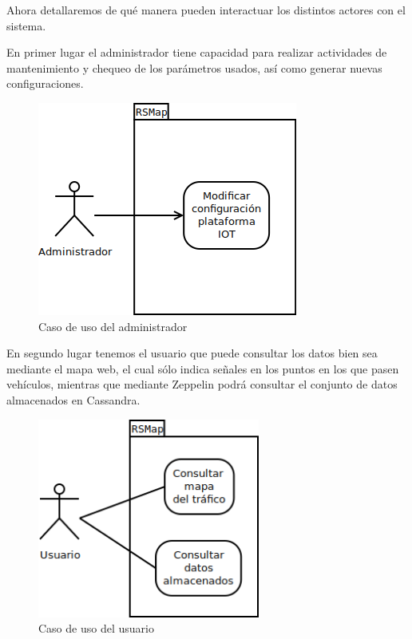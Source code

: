 Ahora detallaremos de qué manera pueden interactuar los distintos actores con el sistema.

En primer lugar el administrador tiene capacidad para realizar actividades de mantenimiento y chequeo de los parámetros usados, así como generar nuevas configuraciones.
\begin{figure}[!ht]
  \begin{center}
    \includegraphics[scale=0.65]{../images/diag_plan/cu_admin.png}
    \caption{Caso de uso del administrador}
    \label{fig:cu_admin}
  \end{center}
\end{figure}

\newpage

En segundo lugar tenemos el usuario que puede consultar los datos bien sea mediante el mapa web, el cual sólo indica señales en los puntos en los que pasen vehículos, mientras que mediante Zeppelin podrá consultar el conjunto de datos almacenados en Cassandra.

\begin{figure}[!ht]
  \begin{center}
  \includegraphics[width=0.65\textwidth]{../images/diag_plan/cu_usuario.png}
  \caption{Caso de uso del usuario}
  \label{fig:cu_usuario}
  \end{center}
\end{figure}

